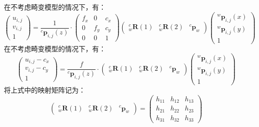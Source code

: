 \documentclass[12pt, onecolumn]{article}
\newcommand\normf{\fangsong}
\begin{document}
	\subsection{\normf{参数求解}}
	在不考虑畸变模型的情况下，有：
	\begin{equation}
	\begin{pmatrix}
	u_{i,j}\\v_{i,j}\\1
	\end{pmatrix}=\frac{1}{{^c\boldsymbol{p}_{i,j}}(z)}\cdot
	\begin{pmatrix}
	f_x&0&c_x\\
	0&f_y&c_y\\
	0&0&1
	\end{pmatrix}\begin{pmatrix}
	{^{c}_{w}\boldsymbol{R}(1)}&
	{^{c}_{w}\boldsymbol{R}(2)}&
	{^c\boldsymbol{p}_{w}}
	\end{pmatrix}
	\begin{pmatrix}
	{^w\boldsymbol{p}_{i,j}}(x)\\{^w\boldsymbol{p}_{i,j}}(y)\\1
	\end{pmatrix}
	\end{equation}
	在不考虑畸变模型的情况下，有：
	\begin{equation}
	\begin{pmatrix}
	u_{i,j}-c_x\\v_{i,j}-c_y\\1
	\end{pmatrix}=\frac{f}{{^c\boldsymbol{p}_{i,j}}(z)}\cdot
	\begin{pmatrix}
	{^{c}_{w}\boldsymbol{R}(1)}&
	{^{c}_{w}\boldsymbol{R}(2)}&
	{^c\boldsymbol{p}_{w}}
	\end{pmatrix}
	\begin{pmatrix}
	{^w\boldsymbol{p}_{i,j}}(x)\\{^w\boldsymbol{p}_{i,j}}(y)\\1
	\end{pmatrix}
	\end{equation}
	将上式中的映射矩阵记为：
	\begin{equation}
	\begin{pmatrix}
		{^{c}_{w}\boldsymbol{R}(1)}&
		{^{c}_{w}\boldsymbol{R}(2)}&
		{^c\boldsymbol{p}_{w}}
		\end{pmatrix}=\begin{pmatrix}
		h_{11}&h_{12}&h_{13}\\
		h_{21}&h_{22}&h_{23}\\
		h_{31}&h_{32}&h_{33}
		\end{pmatrix}
	\end{equation}
\end{document}
